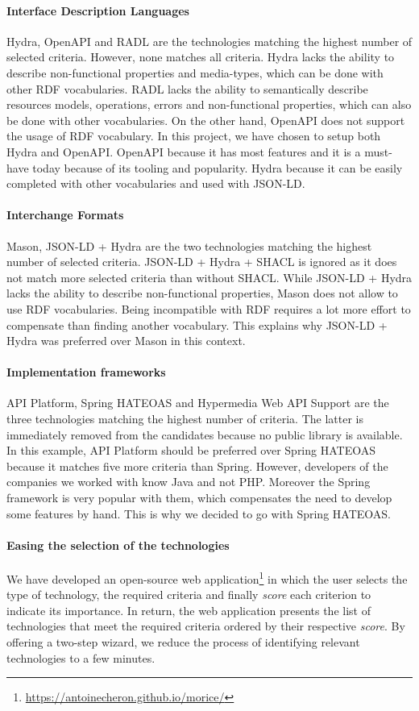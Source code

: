 \paragraph{Interface Description Languages}
Hydra, OpenAPI and RADL are the technologies matching the highest number of selected criteria. However, none matches all criteria. Hydra lacks the ability to describe non-functional properties and media-types, which can be done with other RDF vocabularies. RADL lacks the ability to semantically describe resources models, operations, errors and non-functional properties, which can also be done with other vocabularies. On the other hand, OpenAPI does not support the usage of RDF vocabulary. 
In this project, we have chosen to setup both Hydra and OpenAPI. OpenAPI because it has most features and it is a must-have today because of its tooling and popularity. Hydra because it can be easily completed with other vocabularies and used with JSON-LD.

\paragraph{Interchange Formats}
Mason, JSON-LD + Hydra are the two technologies matching the highest number of selected criteria. JSON-LD + Hydra + SHACL is ignored as it does not match more selected criteria than without SHACL. While JSON-LD + Hydra lacks the ability to describe non-functional properties, Mason does not allow to use RDF vocabularies. Being incompatible with RDF requires a lot more effort to compensate than finding another vocabulary. This explains why JSON-LD + Hydra was preferred over Mason in this context.

\paragraph{Implementation frameworks}
API Platform, Spring HATEOAS and Hypermedia Web API Support \cite{salvadori2014framework} are the three technologies matching the highest number of criteria. The latter is immediately removed from the candidates because no public library is available. In this example, API Platform should be preferred over Spring HATEOAS because it matches five more criteria than Spring. However, developers of the companies we worked with know Java and not PHP. Moreover the Spring framework is very popular with them, which compensates the need to develop some features by hand. This is why we decided to go with Spring HATEOAS.

\paragraph{Easing the selection of the technologies}
We have developed an open-source web application{\footnote{\url{https://antoinecheron.github.io/morice/}}} in which the user selects the type of technology, the required criteria and finally \textit{score} each criterion to indicate its importance. 
In return, the web application presents the list of technologies that meet the required criteria ordered by their respective \textit{score}.
By offering a two-step wizard, we reduce the process of identifying relevant technologies to a few minutes.


